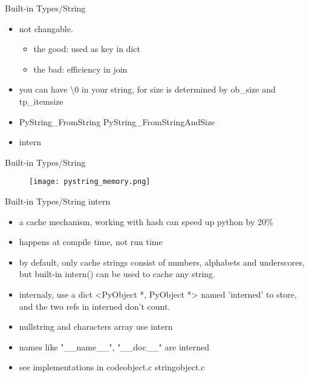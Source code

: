 \documentclass[xcolor=svgnames]{beamer}
\begin{document}
\begin{frame}{Built-in Types/String}
\begin{itemize} 
  \item not changable.
      \begin{itemize}
        \item the good: used as key in dict
        \item the bad: efficiency in join
      \end{itemize}
  \item you can have \textbackslash0 in your string, for size is determined by ob\_size and tp\_itemsize
  \item PyString\_FromString PyString\_FromStringAndSize
  \item intern
    \end{itemize} 
\end{frame}

\begin{frame}[fragile]{Built-in Types/String}
    \begin{figure}
       \begin{center}
       \texttt{[image: pystring\_memory.png]}
       \end{center}
\end{figure}
\end{frame}

\begin{frame}{Built-in Types/String}
intern
\begin{itemize} 
        \item a cache mechanism, working with hash can speed up python by 20\%
        \item happens at compile time, not run time
        \item by default, only cache strings consist of numbers, alphabets and underscores, but built-in intern() can be used to cache any string.
        \item internaly, use a dict <PyObject *, PyObject *> named 'interned' to store, and the two refs in interned don't count.
        \item nullstring and characters array use intern
        \item names like "\_\_name\_\_", "\_\_doc\_\_" are interned
        \item see implementations in codeobject.c stringobject.c
\end{itemize} 
\end{frame}
\end{document}
